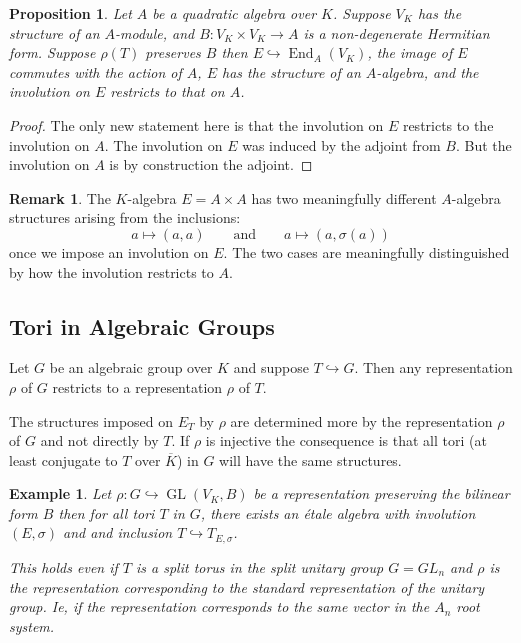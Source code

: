 \documentclass{article}
\theoremstyle{plain}
\newtheorem{proposition}[theorem]{Proposition}
\newtheorem{example}[theorem]{Example}
\theoremstyle{definition}
\newtheorem{remark}[theorem]{Remark}
\DeclareMathOperator{\End}{End}
\DeclareMathOperator{\GL}{GL}
\begin{document}
\begin{proposition}
Let $A$ be a quadratic algebra over $K$. Suppose $V_K$ has the structure of an $A$-module, and $B : V_K \times V_K \rightarrow A$ is a non-degenerate Hermitian form.
Suppose  $\rho(T)$ preserves $B$ then $E\hookrightarrow \End_A(V_K)$, the image of $E$ commutes with the action of $A$,  $E$ has the structure of an $A$-algebra, and the involution on $E$ restricts to that on $A$.
\end{proposition}
\begin{proof}
The only new statement here is that the involution on $E$ restricts to the involution on $A$.
The involution on $E$ was induced by the adjoint from $B$. But the involution on $A$ is by construction the adjoint.
\end{proof}
\begin{remark}
The $K$-algebra $E= A\times A$ has two meaningfully different $A$-algebra structures arising from the inclusions:
\[ a \mapsto (a,a) \qquad \text{and}\qquad a\mapsto (a,\sigma(a)) \]
once we impose an involution on $E$. The two cases are meaningfully distinguished by how the involution restricts to $A$.
\end{remark}


\subsection{Tori in Algebraic Groups}

Let $G$ be an algebraic group over $K$ and suppose $T \hookrightarrow G$.
Then any representation $\rho$ of $G$ restricts to a representation $\rho$ of $T$.

The structures imposed on $E_T$ by $\rho$ are determined more by the representation $\rho$ of $G$ and not directly by $T$. If $\rho$ is injective the consequence is that all tori (at least conjugate to $T$ over $\overline{K}$) in $G$ will have the same structures.

\begin{example}
Let $\rho:G \hookrightarrow \GL(V_K,B)$ be a representation preserving the bilinear form $B$ then for all tori $T$ in $G$, there exists an \'etale algebra with involution $(E,\sigma)$ and and inclusion $T \hookrightarrow T_{E,\sigma}$.

This holds even if $T$ is a split torus in the split unitary group $G=GL_n$ and $\rho$ is the representation corresponding to the standard representation of the unitary group. Ie, if the representation corresponds to the same vector in the $A_n$ root system.
\end{example}
\end{document}
